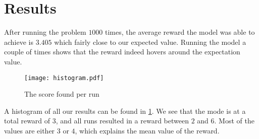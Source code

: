 \documentclass[nonacm,sigconf]{acmart}
\begin{document}
\section{Results}

 After running the problem $1000$ times, the average reward the model was able to achieve is
$3.405$ which fairly close to our expected value. Running the model a couple of
times shows that the reward indeed hovers around the expectation value.

\begin{figure}[b]
    \texttt{[image: histogram.pdf]}
    \caption{The score found per run}
    \label{fig:histogram}
\end{figure}

A histogram of all our results can be found in \cref{fig:histogram}. We see that
the mode is at a total reward of $3$, and all runs resulted in a reward between
$2$ and $6$. Most of the values are either $3$ or $4$, which explains the mean
value of the reward.

%
%
\end{document}
